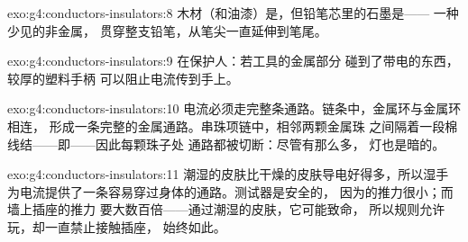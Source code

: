 \begin{solution}{exo:g4:conductors-insulators:8}
木材（和油漆）是，但铅笔芯里的石墨是——
一种少见的非金属，
贯穿整支铅笔，从笔尖一直延伸到笔尾。
\end{solution}

\begin{solution}{exo:g4:conductors-insulators:9}
在保护人：若工具的金属部分
碰到了带电的东西，较厚的塑料手柄
可以阻止电流传到手上。
\end{solution}

\begin{solution}{exo:g4:conductors-insulators:10}
电流必须走完整条通路。链条中，金属环与金属环相连，
形成一条完整的金属通路。串珠项链中，相邻两颗金属珠
之间隔着一段棉线结——即——因此每颗珠子处
通路都被切断：尽管有那么多，
灯也是暗的。
\end{solution}

\begin{solution}{exo:g4:conductors-insulators:11}
潮湿的皮肤比干燥的皮肤导电好得多，所以湿手
为电流提供了一条容易穿过身体的通路。测试器是安全的，
因为的推力很小；而墙上插座的推力
要大数百倍——通过潮湿的皮肤，它可能致命，
所以规则允许玩，却一直禁止接触插座，
始终如此。
\end{solution}
